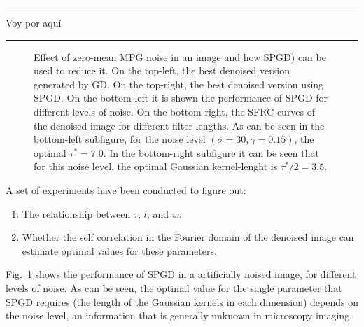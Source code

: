 \documentclass{article}
\begin{document}
{\color{red} \hrule Voy por aquí \hrule}

\begin{figure}
  \centering
  \caption{Effect of zero-mean MPG noise in an image and how SPGD)
    can be used to reduce it. On the top-left, the best
    denoised version generated by GD. On the top-right, the best denoised version using
    SPGD. On the bottom-left it is shown the performance
    of SPGD for different levels of noise. On the bottom-right, the SFRC curves
    of the denoised image for different filter lengths. As can be seen
    in the bottom-left subfigure, for the noise level $(\sigma=30,
    \gamma=0.15)$, the optimal $\tau^*=7.0$. In the bottom-right
    subfigure it can be seen that for this noise level, the optimal
    Gaussian kernel-lenght is $\tau^*/2=3.5$.
    \label{fig:SPGD_0MMPG}}
\end{figure}

A set of experiments have been conducted to figure out:
\begin{enumerate}
\item The relationship between $\tau$, $l$, and $w$.
\item Whether the self correlation in the Fourier domain of the
  denoised image can estimate optimal values for these parameters.
\end{enumerate}

Fig.~\ref{fig:SPGD_0MMPG} shows the performance of SPGD in a artificially
noised image, for different levels of noise. As can be seen, the
optimal value for the single parameter that SPGD requires (the length of
the Gaussian kernels in each dimension) depends on the noise level, an
information that is generally unknown in microscopy imaging.
\end{document}
